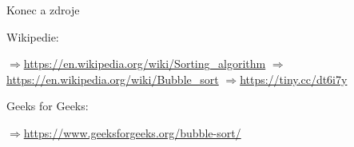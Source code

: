 \documentclass[11pt]{beamer}
\begin{document}
\begin{frame}{Konec a zdroje}

Wikipedie:

\(\Rightarrow\)\;\url{https://en.wikipedia.org/wiki/Sorting_algorithm}
\(\Rightarrow\)\;\url{https://en.wikipedia.org/wiki/Bubble_sort}
\(\Rightarrow\)\;\url{https://tiny.cc/dt6i7y}

\medskip
Geeks for Geeks:

\(\Rightarrow\)\;\url{https://www.geeksforgeeks.org/bubble-sort/}



\end{frame}
\end{document}
